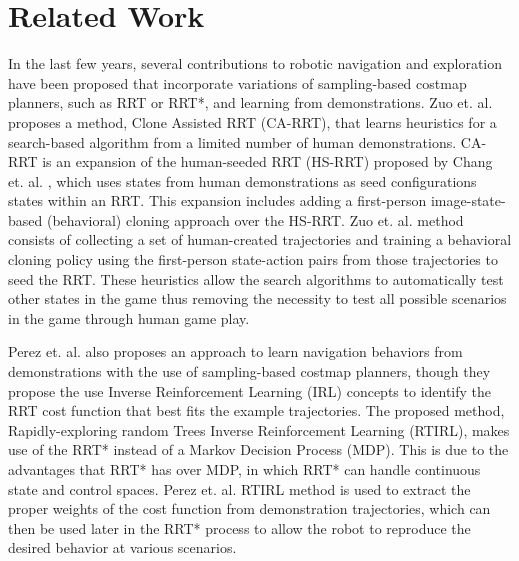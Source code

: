 \documentclass{article}
\begin{document}
\section{Related Work}

In the last few years, several contributions to robotic navigation and exploration have been proposed that incorporate variations of sampling-based costmap planners, such as RRT or RRT*, and learning from demonstrations. Zuo et. al. \cite{Zuo} proposes a method, Clone Assisted RRT (CA-RRT), that learns heuristics for a search-based algorithm from a limited number of human demonstrations. CA-RRT is an expansion of the human-seeded RRT (HS-RRT) proposed by Chang et. al. \cite{Chang}, which uses states from human demonstrations as seed configurations states within an RRT. This expansion includes adding a first-person image-state-based (behavioral) cloning approach over the HS-RRT. Zuo et. al. \cite{Zuo} method consists of collecting a set of human-created trajectories and training a behavioral cloning policy using the first-person state-action pairs from those trajectories to seed the RRT. These heuristics allow the search algorithms to automatically test other states in the game thus removing the necessity to test all possible scenarios in the game through human game play.

Perez et. al. \cite{Perez} also proposes an approach to learn navigation behaviors from demonstrations with the use of sampling-based costmap planners, though they propose the use Inverse Reinforcement Learning (IRL) concepts to identify the RRT cost function that best fits the example trajectories. The proposed method, Rapidly-exploring random Trees Inverse Reinforcement Learning (RTIRL), makes use of the RRT* instead of a Markov Decision Process (MDP). This is due to the advantages that RRT* has over MDP, in which RRT* can handle continuous state and control spaces. Perez et. al. \cite{Perez} RTIRL method is used to extract the proper weights of the cost function from demonstration trajectories, which can then be used later in the RRT* process to allow the robot to reproduce the desired behavior at various scenarios. 
\end{document}
